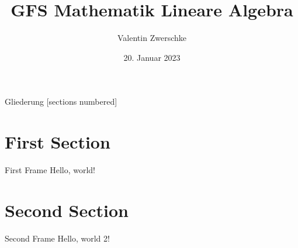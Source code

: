\documentclass[10pt,aspectratio=169]{beamer}
\title{GFS Mathematik Lineare Algebra}
\date{20. Januar 2023}
\author{Valentin Zwerschke}
\institute{Königin-Olga-Stift Gymnasium}
\begin{document}
  \maketitle

  \begin{frame}{Gliederung}
	[sections numbered]
	\tableofcontents[hideallsubsections]
  \end{frame}

  \section{First Section}
  \begin{frame}{First Frame}
    Hello, world!
  \end{frame}
  
  \section{Second Section}
  \begin{frame}{Second Frame}
    Hello, world 2!
  \end{frame}
\end{document}
